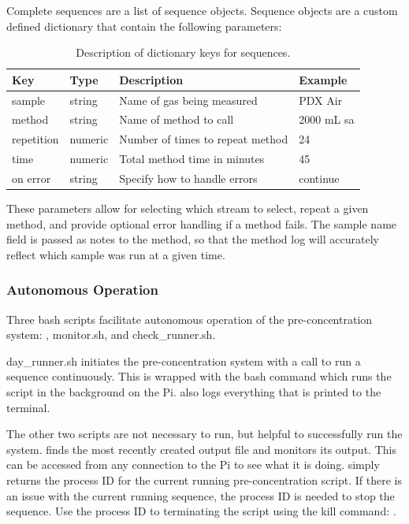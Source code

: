 Complete sequences are a list of sequence objects. Sequence objects are a custom defined dictionary that contain the following parameters:

\begin{table}[H]
    \centering
    \caption{Description of dictionary keys for sequences.}
    \begin{tabular}{l|p{0.5in}p{3in}p{1in}}
        Key         & Type      & Description   & Example\\
        \hline
        sample        & string    & Name of gas being measured & PDX Air\\
        method      & string      & Name of method to call    & 2000 mL sa\\
        repetition         & numeric   & Number of times to repeat method   & 24\\
        time         & numeric   & Total method time in minutes & 45\\
        on error   & string   & Specify how to handle errors & continue\\
    \end{tabular}
    \label{tab:sequence keys}
\end{table}

These parameters allow for selecting which stream to select, repeat a given method, and provide optional error handling if a method fails. The sample name field is passed as notes to the method, so that the method log will accurately reflect which sample was run at a given time.

\subsubsection{Autonomous Operation}
\label{auto operation}
Three bash scripts facilitate autonomous operation of the pre-concentration system: , monitor.sh, and check\_runner.sh.

day\_runner.sh initiates the pre-concentration system with a call to run a sequence continuously. This is wrapped with the  bash command which runs the script in the background on the Pi.  also logs everything that is printed to the terminal.

The other two scripts are not necessary to run, but helpful to successfully run the system. 
 finds the most recently created  output file and monitors its output. This can be accessed from any connection to the Pi to see what it is doing. 
 simply returns the process ID for the current running pre-concentration script. If there is an issue with the current running sequence, the process ID is needed to stop the sequence. Use the process ID to terminating the  script using the kill command: 
.

